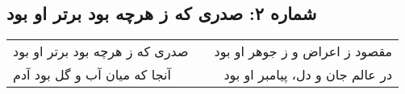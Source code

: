 \begin{center}
\section*{شماره ۲: صدری که ز هرچه بود برتر او بود}
\label{sec:002}
\begin{longtable}{l p{0.5cm} r}
صدری که ز هرچه بود برتر او بود
&&
مقصود ز اعراض و ز جوهر او بود
\\
آنجا که میان آب و گل بود آدم
&&
در عالم جان و دل، پیامبر او بود
\\
\end{longtable}
\end{center}
